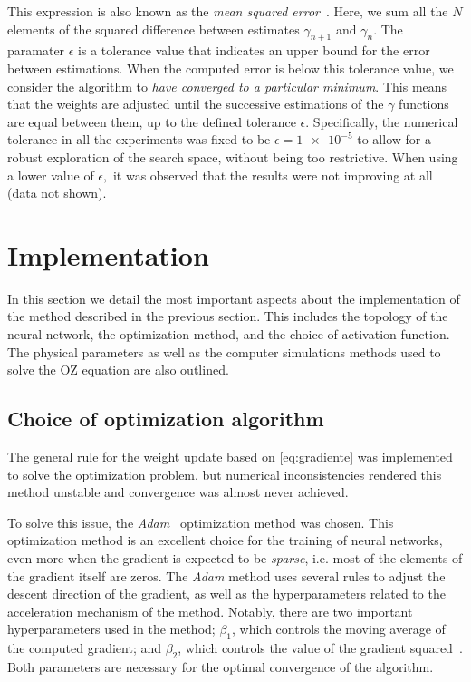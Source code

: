This expression is also known as the \emph{mean squared error}~\cite{goodfellowDeepLearning2016}.
Here, we sum all the $N$ elements of the squared difference between estimates $\gamma_{n+1}$
and $\gamma_{n}$. The paramater $\epsilon$ is a tolerance value that indicates an 
upper bound for the error between estimations. When the computed error is below this 
tolerance value, we consider the algorithm to \emph{have converged to a particular minimum}.
This means that the weights are adjusted until the successive estimations of the $\gamma$
functions are equal between them, up to the defined tolerance $\epsilon$.
Specifically, the numerical tolerance in all the experiments was fixed to be
$\epsilon = \num{1e-5}$ to allow for a robust exploration of the search space, without being
too restrictive. When using a lower value of $\epsilon,$ it was observed that the results 
were not improving at all (data not shown).

\section{Implementation}
In this section we detail the most important aspects about the implementation of the
method described in the previous section. This includes the topology of the neural network,
the optimization method, and the choice of activation function. The physical parameters
as well as the computer simulations methods used to solve the OZ equation are also outlined.

\subsection{Choice of optimization algorithm}
The general rule for the weight update based on \autoref{eq:gradiente} was
implemented to solve the optimization problem, but numerical inconsistencies rendered this 
method unstable and convergence was almost never achieved.

To solve this issue, the \emph{Adam}~\cite{kingmaAdamMethodStochastic2017} optimization 
method was chosen. This optimization method is an excellent choice for the training
of neural networks, even more when the gradient is expected to be \emph{sparse}, i.e.
most of the elements of the gradient itself are zeros.
The \emph{Adam} method uses several rules to adjust the descent direction of the gradient,
as well as the hyperparameters related to the acceleration mechanism of the method.
Notably, there are two important hyperparameters used in the method; $\beta_1$,
which controls the moving average of the computed gradient; and $\beta_2$, which controls
the value of the gradient squared~\cite{kingmaAdamMethodStochastic2017}. Both parameters 
are necessary for the optimal convergence of the algorithm.

